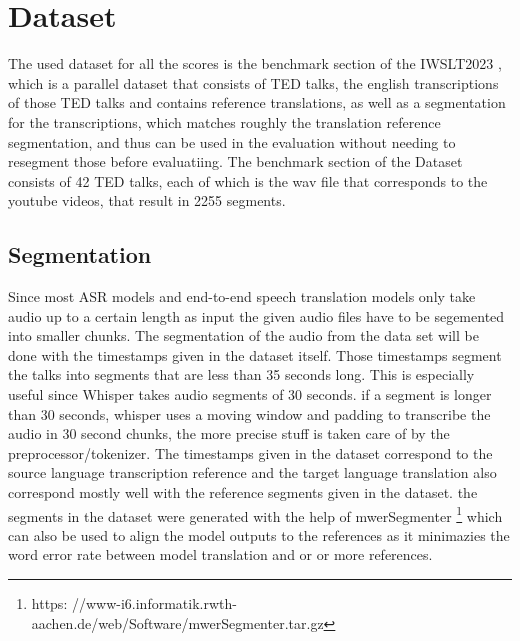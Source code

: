 \section{Dataset}
\label{ch:Dataset}
The used dataset for all the scores is the benchmark section of the IWSLT2023 \cite{sperber2024evaluating}, which is a parallel dataset that consists of TED talks, the english transcriptions of those TED talks and contains reference translations, as well as a segmentation for the transcriptions, which matches roughly the translation reference segmentation, and thus can be used in the evaluation without needing to resegment those before evaluatiing.
The benchmark section of the Dataset consists of 42 TED talks, each of which is the wav file that corresponds to the youtube videos, that result in 2255 segments. 
\subsection{Segmentation}
\label{sec:FirstContent:Segmentation}
Since most ASR models and end-to-end speech translation models only take audio up to a certain length as input the given audio files have to be segemented into smaller chunks. 
The segmentation of the audio from the data set will be done with the timestamps given in the dataset itself. 
Those timestamps segment the talks into segments that are less than 35 seconds long.
This is especially useful since Whisper takes audio segments of 30 seconds. 
if a segment is longer than 30 seconds, whisper uses a moving window and padding to transcribe the audio in 30 second chunks, the more precise stuff is taken care of by the preprocessor/tokenizer.
The timestamps given in the dataset correspond to the source language transcription reference and the target language translation also correspond mostly well with the reference segments given in the dataset. 
the segments in the dataset were generated with the help of mwerSegmenter \footnote{https:
//www-i6.informatik.rwth-aachen.de/web/Software/mwerSegmenter.tar.gz} which can also be used to align the model outputs to the references as it minimazies the word error rate between model translation and or or more references.

